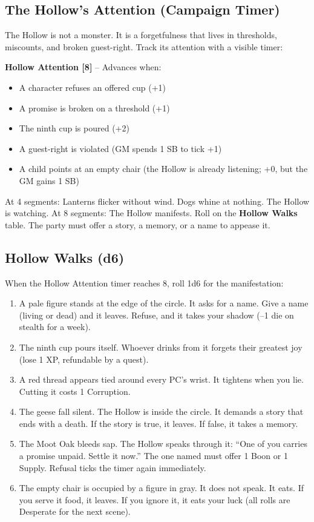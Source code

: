 \documentclass[12pt,oneside]{book}
\begin{document}
\subsection*{The Hollow's Attention (Campaign Timer)}

The Hollow is not a monster. It is a forgetfulness that lives in thresholds, miscounts, and broken guest-right. Track its attention with a visible timer:

\textbf{Hollow Attention [8]} -- Advances when:
\begin{itemize}
\item A character refuses an offered cup (+1)
\item A promise is broken on a threshold (+1)
\item The ninth cup is poured (+2)
\item A guest-right is violated (GM spends 1 SB to tick +1)
\item A child points at an empty chair (the Hollow is already listening; +0, but the GM gains 1 SB)
\end{itemize}
At 4 segments: Lanterns flicker without wind. Dogs whine at nothing. The Hollow is watching.  
At 8 segments: The Hollow manifests. Roll on the \textbf{Hollow Walks} table. The party must offer a story, a memory, or a name to appease it.

\subsection*{Hollow Walks (d6)}
When the Hollow Attention timer reaches 8, roll 1d6 for the manifestation:
\begin{enumerate}
\item A pale figure stands at the edge of the circle. It asks for a name. Give a name (living or dead) and it leaves. Refuse, and it takes your shadow (--1 die on stealth for a week).
\item The ninth cup pours itself. Whoever drinks from it forgets their greatest joy (lose 1 XP, refundable by a quest).
\item A red thread appears tied around every PC's wrist. It tightens when you lie. Cutting it costs 1 Corruption.
\item The geese fall silent. The Hollow is inside the circle. It demands a story that ends with a death. If the story is true, it leaves. If false, it takes a memory.
\item The Moot Oak bleeds sap. The Hollow speaks through it: ``One of you carries a promise unpaid. Settle it now.'' The one named must offer 1 Boon or 1 Supply. Refusal ticks the timer again immediately.
\item The empty chair is occupied by a figure in gray. It does not speak. It eats. If you serve it food, it leaves. If you ignore it, it eats your luck (all rolls are Desperate for the next scene).
\end{enumerate}
\end{document}
